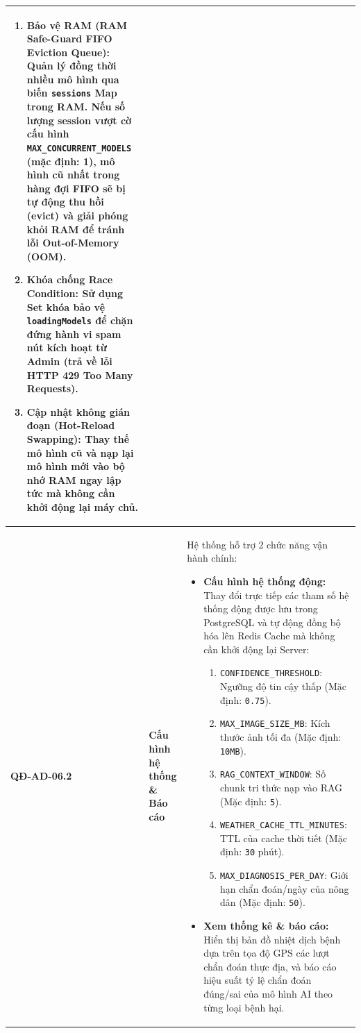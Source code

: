 \documentclass[12pt,a4paper]{article}
\begin{document}
\begin{longtable}{|
        >{\raggedright\arraybackslash}p{2.2cm}|
        >{\raggedright\arraybackslash}p{2.8cm}|
        >{\raggedright\arraybackslash}p{9.8cm}|}
\begin{enumerate}[leftmargin=*,topsep=2pt,itemsep=1pt]
        \item \textbf{Bảo vệ RAM (RAM Safe-Guard FIFO Eviction Queue):} Quản lý đồng thời nhiều mô hình qua biến \texttt{sessions} Map trong RAM. Nếu số lượng session vượt cờ cấu hình \texttt{MAX\_CONCURRENT\_MODELS} (mặc định: 1), mô hình cũ nhất trong hàng đợi FIFO sẽ bị tự động thu hồi (evict) và giải phóng khỏi RAM để tránh lỗi Out-of-Memory (OOM).
        \item \textbf{Khóa chống Race Condition:} Sử dụng Set khóa bảo vệ \texttt{loadingModels} để chặn đứng hành vi spam nút kích hoạt từ Admin (trả về lỗi HTTP 429 Too Many Requests).
        \item \textbf{Cập nhật không gián đoạn (Hot-Reload Swapping):} Thay thế mô hình cũ và nạp lại mô hình mới vào bộ nhớ RAM ngay lập tức mà không cần khởi động lại máy chủ.
    \end{enumerate} \\
    \hline
    \textbf{QĐ-AD-06.2}  & \textbf{Cấu hình hệ thống \& Báo cáo} &
    Hệ thống hỗ trợ 2 chức năng vận hành chính:
    \begin{itemize}[leftmargin=*,topsep=2pt,itemsep=1pt]
        \item \textbf{Cấu hình hệ thống động:} Thay đổi trực tiếp các tham số hệ thống động được lưu trong PostgreSQL và tự động đồng bộ hóa lên Redis Cache mà không cần khởi động lại Server:
              \begin{enumerate}[leftmargin=*,topsep=2pt,itemsep=1pt]
                  \item \texttt{CONFIDENCE\_THRESHOLD}: Ngưỡng độ tin cậy thấp (Mặc định: \texttt{0.75}).
                  \item \texttt{MAX\_IMAGE\_SIZE\_MB}: Kích thước ảnh tối đa (Mặc định: \texttt{10MB}).
                  \item \texttt{RAG\_CONTEXT\_WINDOW}: Số chunk tri thức nạp vào RAG (Mặc định: \texttt{5}).
                  \item \texttt{WEATHER\_CACHE\_TTL\_MINUTES}: TTL của cache thời tiết (Mặc định: \texttt{30} phút).
                  \item \texttt{MAX\_DIAGNOSIS\_PER\_DAY}: Giới hạn chẩn đoán/ngày của nông dân (Mặc định: \texttt{50}).
              \end{enumerate}
        \item \textbf{Xem thống kê \& báo cáo:} Hiển thị bản đồ nhiệt dịch bệnh dựa trên tọa độ GPS các lượt chẩn đoán thực địa, và báo cáo hiệu suất tỷ lệ chẩn đoán đúng/sai của mô hình AI theo từng loại bệnh hại.
    \end{itemize}                                                                                                                                             \\
    \hline
\end{longtable}
\end{document}
